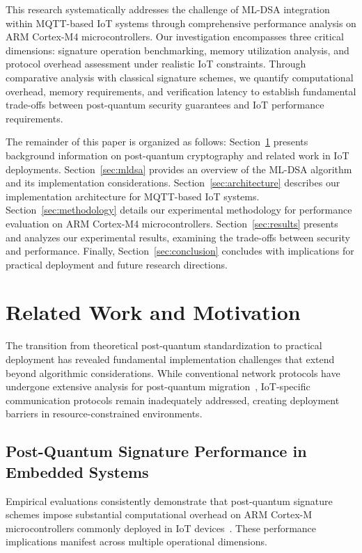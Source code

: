 \documentclass[journal=tches,final]{iacrtrans}
\begin{document}
This research systematically addresses the challenge of ML-DSA integration within MQTT-based IoT systems through comprehensive performance analysis on ARM Cortex-M4 microcontrollers. Our investigation encompasses three critical dimensions: signature operation benchmarking, memory utilization analysis, and protocol overhead assessment under realistic IoT constraints. Through comparative analysis with classical signature schemes, we quantify computational overhead, memory requirements, and verification latency to establish fundamental trade-offs between post-quantum security guarantees and IoT performance requirements.

The remainder of this paper is organized as follows: Section~\ref{sec:related} presents background information on post-quantum cryptography and related work in IoT deployments. Section~\ref{sec:mldsa} provides an overview of the ML-DSA algorithm and its implementation considerations. Section~\ref{sec:architecture} describes our implementation architecture for MQTT-based IoT systems. Section~\ref{sec:methodology} details our experimental methodology for performance evaluation on ARM Cortex-M4 microcontrollers. Section~\ref{sec:results} presents and analyzes our experimental results, examining the trade-offs between security and performance. Finally, Section~\ref{sec:conclusion} concludes with implications for practical deployment and future research directions.

\section{Related Work and Motivation}\label{sec:related}

The transition from theoretical post-quantum standardization to practical deployment has revealed fundamental implementation challenges that extend beyond algorithmic considerations. While conventional network protocols have undergone extensive analysis for post-quantum migration~\cite{Kampanakis2020, Sikeridis2020}, IoT-specific communication protocols remain inadequately addressed, creating deployment barriers in resource-constrained environments.

\subsection{Post-Quantum Signature Performance in Embedded Systems}

Empirical evaluations consistently demonstrate that post-quantum signature schemes impose substantial computational overhead on ARM Cortex-M microcontrollers commonly deployed in IoT devices~\cite{Banegas2021, Marchsreiter2024}. These performance implications manifest across multiple operational dimensions.
\end{document}
